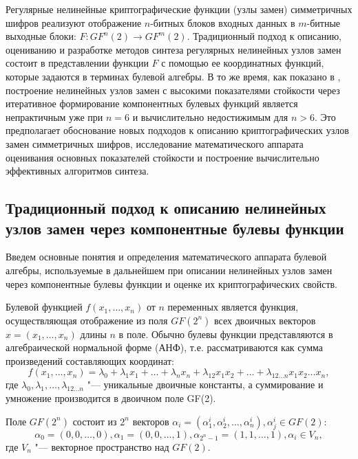 Регулярные нелинейные криптографические функции (узлы замен) симметричных шифров
реализуют отображение $n$-битных блоков входных данных в $m$-битные выходные
блоки: $F: GF^n(2) \rightarrow GF^m(2)$. Традиционный подход к описанию,
оцениванию и разработке методов синтеза регулярных нелинейных узлов замен
состоит в представлении функции $F$ с помощью ее координатных функций, которые
задаются в терминах булевой алгебры. В то же время, как показано в
\cite{Connor,Soroka}, построение нелинейных узлов замен с высокими показателями
стойкости через итеративное формирование компонентных булевых функций является
непрактичным уже при $n=6$ и вычислительно недостижимым для $n>6$. Это
предполагает обоснование новых подходов к описанию криптографических узлов замен
симметричных шифров, исследование математического аппарата оценивания основных
показателей стойкости и построение вычислительно эффективных алгоритмов синтеза.

\subsection{Традиционный подход к описанию нелинейных узлов замен через
компонентные булевы функции}

Введем основные понятия и определения математического аппарата булевой алгебры,
используемые в дальнейшем при описании нелинейных узлов замен через компонентные
булевы функции и оценке их криптографических свойств.

Булевой функцией $f(x_1, \ldots , x_n)$ от $n$ переменных является функция,
осуществляющая отображение из поля $GF(2^n)$ всех двоичных векторов $x=(x_1, \ldots
,x_n)$ длины $n$ в поле. Обычно булевы функции
представляются в алгебраической нормальной форме (АНФ), т.е.  рассматриваются
как сумма произведений составляющих координат:
\begin{equation}f(x_1, \ldots , x_n) = \lambda_0 + \lambda_1 x_1 + \ldots + \lambda_n x_n + \lambda_{12} x_1 x_2 + \ldots + \lambda_{12 \ldots n} x_1 x_2 \ldots x_n,\end{equation}
где $\lambda_0, \lambda_1, \ldots, \lambda_{12 \ldots n}$ "--- уникальные
двоичные константы, а суммирование и умножение производится в двоичном поле
GF(2).

Поле $GF(2^n)$ состоит из $2^n$ векторов $\alpha_i = (\alpha^i_1, \alpha^i_2,
\ldots, \alpha^i_n), \alpha^i_j \in GF(2)$:
\begin{equation}\alpha_0 = (0, 0, \ldots, 0), \alpha_1 = (0, 0, \ldots, 1),
\alpha_{2^n - 1} = (1, 1, \ldots, 1), \alpha_i \in V_n,\end{equation}
где $V_n$ "--- векторное пространство над $GF(2)$.

